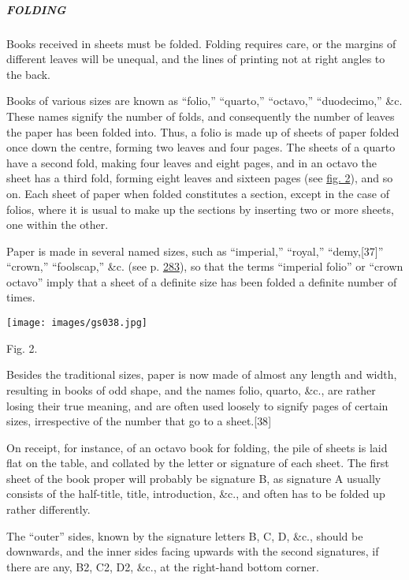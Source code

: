 \documentclass[
]{article}
\begin{document}
\hypertarget{folding}{%
\subparagraph{FOLDING}\label{folding}}

Books received in sheets must be folded. Folding requires care, or the
margins of different leaves will be unequal, and the lines of printing
not at right angles to the back.

Books of various sizes are known as ``folio,'' ``quarto,'' ``octavo,''
``duodecimo,'' \&c. These names signify the number of folds, and
consequently the number of leaves the paper has been folded into. Thus,
a folio is made up of sheets of paper folded once down the centre,
forming two leaves and four pages. The sheets of a quarto have a second
fold, making four leaves and eight pages, and in an octavo the sheet has
a third fold, forming eight leaves and sixteen pages (see
\protect\hyperlink{Fig_2}{fig. 2}), and so on. Each sheet of paper when
folded constitutes a section, except in the case of folios, where it is
usual to make up the sections by inserting two or more sheets, one
within the other.

Paper is made in several named sizes, such as ``imperial,'' ``royal,''
``demy,{\protect\hypertarget{Page_37}{}{{[}37{]}}}'' ``crown,''
``foolscap,'' \&c. (see p. \protect\hyperlink{Page_283}{283}), so that
the terms ``imperial folio'' or ``crown octavo'' imply that a sheet of a
definite size has been folded a definite number of times.

\protect\hypertarget{Fig_2}{}{}
\texttt{[image: images/gs038.jpg]}

Fig. 2.

Besides the traditional sizes, paper is now made of almost any length
and width, resulting in books of odd shape, and the names folio, quarto,
\&c., are rather losing their true meaning, and are often used loosely
to signify pages of certain sizes, irrespective of the number that go to
a sheet.{\protect\hypertarget{Page_38}{}{{[}38{]}}}

On receipt, for instance, of an octavo book for folding, the pile of
sheets is laid flat on the table, and collated by the letter or
signature of each sheet. The first sheet of the book proper will
probably be signature B, as signature A usually consists of the
half-title, title, introduction, \&c., and often has to be folded up
rather differently.

The ``outer'' sides, known by the signature letters B, C, D, \&c.,
should be downwards, and the inner sides facing upwards with the second
signatures, if there are any, B2, C2, D2, \&c., at the right-hand bottom
corner.
\end{document}
